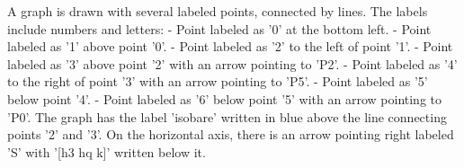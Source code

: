A graph is drawn with several labeled points, connected by lines. The labels include numbers and letters:
- Point labeled as '0' at the bottom left.
- Point labeled as '1' above point '0'.
- Point labeled as '2' to the left of point '1'.
- Point labeled as '3' above point '2' with an arrow pointing to 'P2'.
- Point labeled as '4' to the right of point '3' with an arrow pointing to 'P5'.
- Point labeled as '5' below point '4'.
- Point labeled as '6' below point '5' with an arrow pointing to 'P0'.
The graph has the label 'isobare' written in blue above the line connecting points '2' and '3'. On the horizontal axis, there is an arrow pointing right labeled 'S' with '[h3 hq k]' written below it.